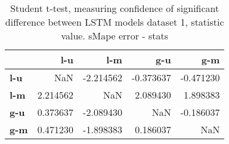 \begin{table}[h]
\centering
\caption{Student t-test, measuring confidence of significant difference between LSTM models dataset 1, statistic value. sMape error - stats}
\label{table:ttest-stats-lstm-experiments-sMAPE-dataset-1}
\begin{tabular}{lrrrr}
\toprule
{} &       l-u &       l-m &       g-u &       g-m \\
\midrule
\textbf{l-u} &       NaN & -2.214562 & -0.373637 & -0.471230 \\
\textbf{l-m} &  2.214562 &       NaN &  2.089430 &  1.898383 \\
\textbf{g-u} &  0.373637 & -2.089430 &       NaN & -0.186037 \\
\textbf{g-m} &  0.471230 & -1.898383 &  0.186037 &       NaN \\
\bottomrule
\end{tabular}
\end{table}
